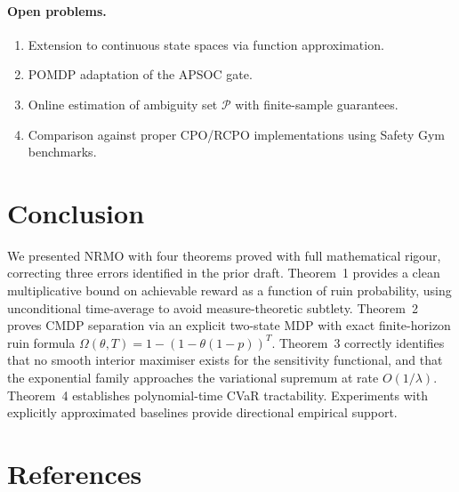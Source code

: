 \paragraph{Open problems.}

\begin{enumerate}
\item Extension to continuous state spaces via function
approximation.
\item POMDP adaptation of the APSOC gate.
\item Online estimation of ambiguity set $\mathcal{P}$ with
finite-sample guarantees.
\item Comparison against proper CPO/RCPO implementations using
Safety Gym benchmarks.
\end{enumerate}

\section{Conclusion}
\label{sec:arxiv-conclusion}

We presented NRMO with four theorems proved with full mathematical
rigour, correcting three errors identified in the prior draft.
Theorem~1 provides a clean multiplicative bound on achievable reward
as a function of ruin probability, using unconditional time-average
to avoid measure-theoretic subtlety. Theorem~2 proves CMDP
separation via an explicit two-state MDP with exact finite-horizon
ruin formula $\Omega(\theta, T) = 1 - (1 - \theta(1 - p))^T$.
Theorem~3 correctly identifies that no smooth interior maximiser
exists for the sensitivity functional, and that the exponential
family approaches the variational supremum at rate $O(1 / \lambda)$.
Theorem~4 establishes polynomial-time CVaR tractability. Experiments
with explicitly approximated baselines provide directional empirical
support.

\section*{References}
\label{sec:arxiv-references}


